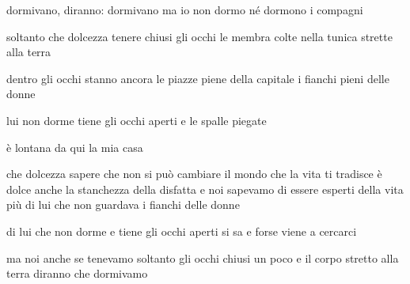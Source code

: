 \begin{poem}
	\begin{stanza}
		dormivano, diranno: dormivano\verseline
		ma io non dormo\verseline
		né dormono i compagni
	\end{stanza}

	\begin{stanza}
		soltanto che dolcezza\verseline
		tenere chiusi gli occhi\verseline
		le membra colte nella tunica\verseline
		strette alla terra
	\end{stanza}

	\begin{stanza}
		dentro gli occhi stanno ancora\verseline
		le piazze piene della capitale\verseline
		i fianchi pieni delle donne
	\end{stanza}

	\begin{stanza}
		lui non dorme\verseline
		tiene gli occhi aperti\verseline
		e le spalle piegate
	\end{stanza}

	\begin{stanza}
		è lontana da qui la mia casa
	\end{stanza}

	\begin{stanza}
		che dolcezza sapere che non si può cambiare il mondo\verseline
		che la vita ti tradisce \verseline
		è dolce anche la stanchezza della disfatta\verseline
		e noi sapevamo di essere esperti della vita\verseline
		più di lui\verseline
		che non guardava i fianchi delle donne
	\end{stanza}

	\begin{stanza}
		di lui\verseline
		che non dorme\verseline
		e tiene gli occhi aperti\verseline
		si sa\verseline
		e forse viene a cercarci
	\end{stanza}

	\begin{stanza}
		ma noi\verseline
		anche se tenevamo soltanto gli occhi chiusi\verseline
		un poco\verseline
		e il corpo stretto alla terra\verseline
		diranno che dormivamo
	\end{stanza}
\end{poem}

\clearpage


